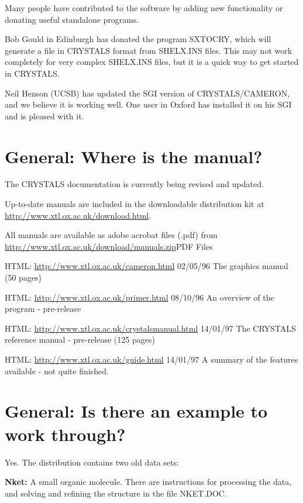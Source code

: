 \documentclass[10pt,a4paper]{report}
\begin{document}
Many people have contributed to the software by adding new functionality or donating useful standalone
programs.


Bob Gould in Edinburgh has donated the program SXTOCRY, which
        will generate a file in CRYSTALS format from SHELX.INS files. This may not
        work completely for very complex SHELX.INS files, but it is a quick way to
        get started in CRYSTALS.


Neil Henson (UCSB) has updated the SGI version of CRYSTALS/CAMERON,
        and we believe it is working well. One user in Oxford has installed it on his
        SGI and is pleased with it.


\section{General: Where is the manual?}


The CRYSTALS documentation is currently being revised and updated.


Up-to-date manuals are included in the downloadable distribution
kit at \url{http://www.xtl.ox.ac.uk/download.html}.


All manuals are available as adobe acrobat files (.pdf) from
\url{http://www.xtl.ox.ac.uk/download/manuals.zip}{PDF Files}



   HTML: \url{http://www.xtl.ox.ac.uk/cameron.html}
 02/05/96 The graphics manual (50 pages)


   HTML: \url{http://www.xtl.ox.ac.uk/primer.html}
 08/10/96 An overview of the program - pre-release


   HTML: \url{http://www.xtl.ox.ac.uk/crystalsmanual.html}
 14/01/97 The CRYSTALS reference manual - pre-release (125 pages)


   HTML: \url{http://www.xtl.ox.ac.uk/guide.html}
 14/01/97 A summary of the features available - not quite finished.

\section{General: Is there an example to work through?}


Yes. The distribution contains two old data sets:


{\bf Nket:} A small organic molecule. There are
instructions for processing the data, and solving and refining the
structure in the file NKET.DOC.
\end{document}
